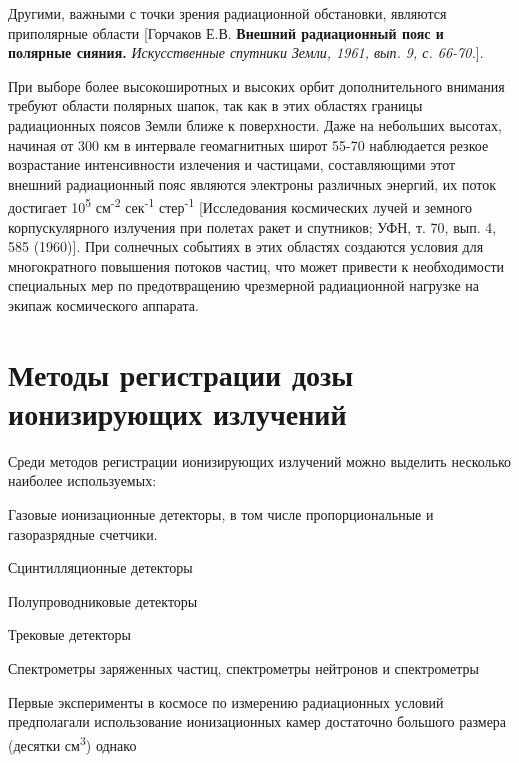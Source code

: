 Другими, важными с точки зрения радиационной обстановки, являются приполярные области [Горчаков Е.В. \textbf{Внешний радиационный пояс и полярные сияния. }\emph{Искусственные спутники Земли, 1961, вып. 9, с. 66-70.}].

При выборе более высокоширотных и высоких орбит дополнительного внимания требуют области полярных шапок, так как в этих областях границы радиационных поясов Земли ближе к поверхности. Даже на небольших высотах, начиная от 300 км в интервале геомагнитных широт 55-70 наблюдается резкое возрастание интенсивности излечения и частицами, составляющими этот внешний радиационный пояс являются электроны различных энергий, их поток достигает 10\textsuperscript{5} см\textsuperscript{-2} сек\textsuperscript{-1} стер\textsuperscript{-1} [Исследования космических лучей и земного корпускулярного излучения при полетах ракет и спутников; УФН, т. 70, вып. 4, 585 (1960)]. При солнечных событиях в этих областях создаются условия для многократного повышения потоков частиц, что может привести к необходимости специальных мер по предотвращению чрезмерной радиационной нагрузке на экипаж космического аппарата.

\section{Методы регистрации дозы ионизирующих излучений} \label{sect1_2}

Среди методов регистрации ионизирующих излучений можно выделить несколько наиболее используемых:


Газовые ионизационные детекторы, в том числе пропорциональные и газоразрядные счетчики.


Сцинтилляционные детекторы


Полупроводниковые детекторы 


Трековые детекторы


Спектрометры заряженных частиц, спектрометры нейтронов и спектрометры 


Первые эксперименты в космосе по измерению радиационных условий предполагали использование ионизационных камер достаточно большого размера (десятки см\textsuperscript{3}) однако 










